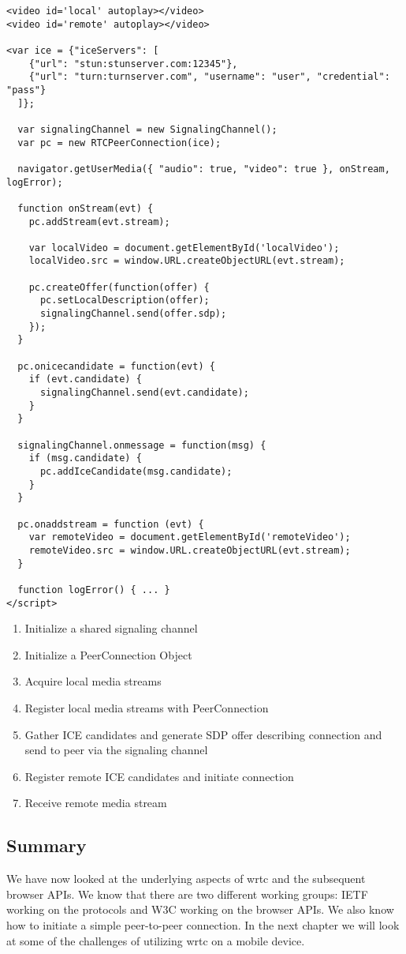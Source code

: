 \begin{lstlisting}
<video id='local' autoplay></video>
<video id='remote' autoplay></video>

<var ice = {"iceServers": [
    {"url": "stun:stunserver.com:12345"},
    {"url": "turn:turnserver.com", "username": "user", "credential": "pass"}
  ]};

  var signalingChannel = new SignalingChannel();
  var pc = new RTCPeerConnection(ice);

  navigator.getUserMedia({ "audio": true, "video": true }, onStream, logError);

  function onStream(evt) {
    pc.addStream(evt.stream);

    var localVideo = document.getElementById('localVideo');
    localVideo.src = window.URL.createObjectURL(evt.stream);

    pc.createOffer(function(offer) {
      pc.setLocalDescription(offer);
      signalingChannel.send(offer.sdp);
    });
  }

  pc.onicecandidate = function(evt) {
    if (evt.candidate) {
      signalingChannel.send(evt.candidate);
    }
  }

  signalingChannel.onmessage = function(msg) {
    if (msg.candidate) {
      pc.addIceCandidate(msg.candidate);
    }
  }

  pc.onaddstream = function (evt) {
    var remoteVideo = document.getElementById('remoteVideo');
    remoteVideo.src = window.URL.createObjectURL(evt.stream);
  }

  function logError() { ... }
</script>
\end{lstlisting}

\begin{enumerate}
\item{Initialize a shared signaling channel}
\item{Initialize a PeerConnection Object}
\item{Acquire local media streams}
\item{Register local media streams with PeerConnection}
\item{Gather ICE candidates and generate SDP offer describing connection and send to peer via the signaling channel}
\item{Register remote ICE candidates and initiate connection}
\item{Receive remote media stream}
\end{enumerate} 


\subsection{Summary}
We have now looked at the underlying aspects of \gls{wrtc} and the subsequent browser APIs. We know that there are two different working groups: IETF working on the protocols and W3C working on the browser APIs. We also know how to initiate a simple peer-to-peer connection. In the next chapter we will look at some of the challenges of utilizing \gls{wrtc} on a mobile device.